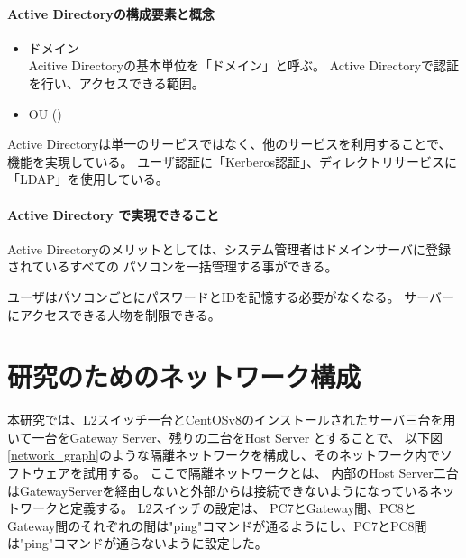 \documentclass[12pt,a4paper,titlepage]{jreport}
\begin{document}

\subsubsection*{Active Directoryの構成要素と概念}

\begin{itemize}
    \item ドメイン\mbox{}\\
    Acitive Directoryの基本単位を「ドメイン」と呼ぶ。
    Active Directoryで認証を行い、アクセスできる範囲。
    
    \item OU ()




\end{itemize}


Active Directoryは単一のサービスではなく、他のサービスを利用することで、機能を実現している。
ユーザ認証に「Kerberos認証」、ディレクトリサービスに「LDAP」を使用している。


\subsubsection*{Active Directory で実現できること}
Active Directoryのメリットとしては、システム管理者はドメインサーバに登録されているすべての
パソコンを一括管理する事ができる。

ユーザはパソコンごとにパスワードとIDを記憶する必要がなくなる。
サーバーにアクセスできる人物を制限できる。


\fi


\chapter{研究のためのネットワーク構成}
本研究では、L2スイッチ一台とCentOSv8のインストールされたサーバ三台を用いて一台をGateway Server、残りの二台をHost Server
とすることで、
以下図\ref{network_graph}のような隔離ネットワークを構成し、そのネットワーク内でソフトウェアを試用する。
ここで隔離ネットワークとは、
内部のHost Server二台はGatewayServerを経由しないと外部からは接続できないようになっているネットワークと定義する。
L2スイッチの設定は、
PC7とGateway間、PC8とGateway間のそれぞれの間は"ping"コマンドが通るようにし、PC7とPC8間は"ping"コマンドが通らないように設定した。
\end{document}
